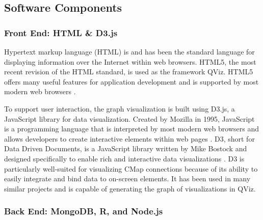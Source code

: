 \documentclass[12pt]{article}
\begin{document}
\subsection{Software Components}
\subsubsection{Front End: HTML \& D3.js}

Hypertext markup language (HTML) is and has been the standard language for displaying information over the Internet within web browsers. HTML5, the most recent revision of the HTML standard, is used as the framework QViz. HTML5 offers many useful features for application development and is supported by most modern web browsers \cite{w3c_html5}. 

To support user interaction, the graph visualization is built using D3.js, a JavaScript library for data visualization. Created by Mozilla in 1995, JavaScript is a programming language that is interpreted by most modern web browsers and allows developers to create interactive elements within web pages \cite{mozilla_javascript}. D3, short for Data Driven Documents, is a JavaScript library written by Mike Bostock and designed specifically to enable rich and interactive data visualizations \cite{bostock_d3}. D3 is particularly well-suited for visualizing CMap connections because of its ability to easily integrate and bind data to on-screen elements. It has been used in many similar projects and is capable of generating the graph of visualizations in QViz.



\subsubsection{Back End: MongoDB, R, and Node.js}
\end{document}
